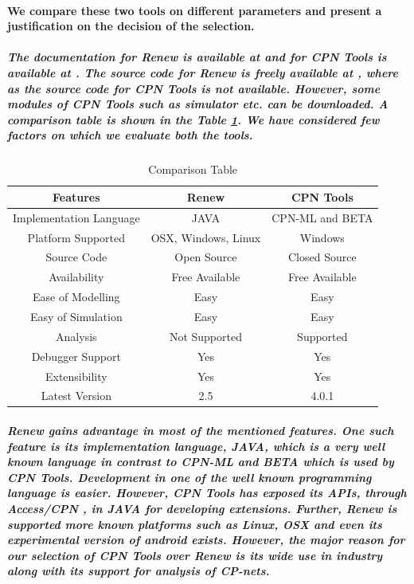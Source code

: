 \paragraph*{\textnormal{We compare these two tools on different parameters and present a justification on the decision of the selection.}}

\subparagraph*{\textnormal{The documentation for Renew is available at \cite{Renew_Homepage} and for CPN Tools is available at \cite{CPN_Tools}. The source code for Renew is freely available at \cite{Renew_Homepage}, where as the source code for CPN Tools is not available. However, some modules of CPN Tools such as \textit{simulator} etc. can be downloaded. A comparison table is shown in the Table \ref{table:Comparison_Tools_Table}. We have considered few factors on which we evaluate both the tools.}}

\begin{table}[!tb]
	\centering
	\begin{tabular}{|c|c|c|}
		\hline
		Features                & Renew                  & CPN Tools       \\ \hline
		Implementation Language & JAVA                   & CPN-ML and BETA \\ \hline
		Platform Supported      & OSX, Windows, Linux 	 & Windows         \\ \hline
		Source Code             & Open Source            & Closed Source   \\ \hline
		Availability            & Free Available         & Free Available  \\ \hline
		Ease of Modelling       & Easy                   & Easy            \\ \hline
		Easy of Simulation      & Easy                   & Easy            \\ \hline
		Analysis                & Not Supported          & Supported       \\ \hline
		Debugger Support        & Yes                    & Yes             \\ \hline
		Extensibility           & Yes                    & Yes             \\ \hline
		Latest Version			& 2.5					 & 4.0.1			\\ \hline
	\end{tabular}
	\caption{Comparison Table}
	\label{table:Comparison_Tools_Table}
\end{table}

\subparagraph*{\textnormal{Renew gains advantage in most of the mentioned features. One such feature is its implementation language, JAVA, which is a very well known language in contrast to CPN-ML and BETA which is used by CPN Tools. Development in one of the well known programming language is easier. However, CPN Tools has exposed its APIs, through Access/CPN \cite{AccessCPN_Library}, in JAVA for developing extensions. Further, Renew is supported more known platforms such as Linux, OSX and even its experimental version of android exists. However, the major reason for our selection of CPN Tools over Renew is its wide use in industry along with its support for analysis of CP-nets.}}

